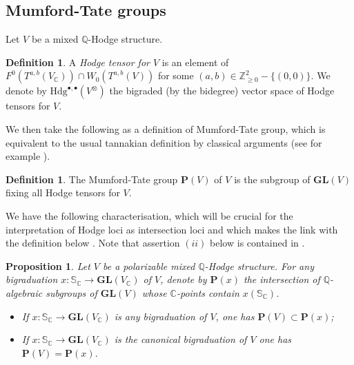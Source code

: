 \documentclass[10pt]{article}
\numberwithin{equation}{subsection}
\theoremstyle{plain}
\newtheorem{proposition}[theorem]{Proposition}
\theoremstyle{definition}
\newtheorem{definition}[theorem]{Definition}
\theoremstyle{remark}
\newcommand{\Z}{\mathbb Z}
\newcommand{\Q}{\mathbb Q}
\newcommand{\C}{\mathbb C}
\newcommand{\s}{\mathbb S}
\newcommand{\pp}{\mathbf P}
\newcommand{\bul}{\bullet}
\newcommand{\hod}{\mathrm{Hdg}}
\newcommand{\gl}{\mathbf{GL}}
\begin{document}
\subsection{Mumford-Tate groups}
Let $V$ be a mixed $\Q$-Hodge structure.
\begin{definition}
A \textit{Hodge tensor for $V$} is an element of $F^0(T^{a,b}(V_\C)) \cap W_0(T^{a,b}(V))$ for some $(a,b) \in \Z_{\geqslant 0}^2 - \{(0,0)\}$. We denote by $\hod^{\bul,\bul}(V^\otimes)$ the bigraded (by the bidegree) vector space of Hodge tensors for $V$.
\end{definition}
We then take the following as a definition of Mumford-Tate group, which is equivalent to the usual tannakian definition by classical arguments (see for example \cite{andre}).
\begin{definition}
The Mumford-Tate group $\pp(V)$ of $V$ is the subgroup of $\gl(V)$ fixing all Hodge tensors for $V$.
\end{definition}
We have the following characterisation, which will be crucial for the interpretation of Hodge loci as intersection loci and which makes the link with the definition below \cite[Prop. 2.3]{klingao}. Note that assertion $(ii)$ below is contained in \cite[(I.C.6)]{ggk}.
\begin{proposition}\label{mtmor}
Let $V$ be a polarizable mixed $\Q$-Hodge structure. For any bigraduation $x : \s_\C \rightarrow \gl(V_\C)$ of $V$, denote by $\pp(x)$ the intersection of $\Q$-algebraic subgroups of $\gl(V)$ whose $\C$-points contain $x(\s_\C)$.
\begin{itemize}
\item[(i)] If $x : \s_\C \rightarrow \gl(V_\C)$ is any bigraduation of $V$, one has $\pp(V) \subset \pp(x)$;
\item[(ii)] If $x : \s_\C \rightarrow \gl(V_\C)$ is the canonical bigraduation of $V$ one has $\pp(V) = \pp(x)$.
\end{itemize}
\end{proposition}
\end{document}
